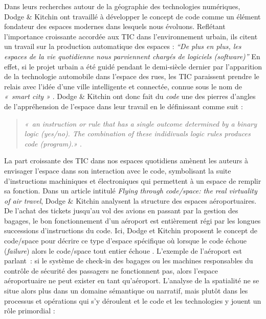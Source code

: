 Dans leurs recherches autour de la géographie des technologies numériques, Dodge \& Kitchin ont travaillé à développer le concept de code comme un élément fondateur des espaces modernes dans lesquels nous évoluons. Reflétant l’importance croissante accordée aux TIC dans l’environnement urbain, ils citent un travail sur la production automatique des espaces : \textit{“De plus en plus, les espaces de la vie  quotidienne nous parviennent chargés de logiciels (software)”} \citep{Thrift2002} En effet, si le projet urbain a été guidé pendant le demi-siècle dernier par l’apparition de la technologie automobile dans l’espace des rues, les TIC paraissent prendre le relais avec l’idée d’une ville intelligente et connectée, connue sous le nom de \textit{« smart city »} \citep{Ascher2009,Picon2014}. Dodge \& Kitchin ont donc fait du \textit{code} une des pierres d’angles de l’appréhension de l’espace dans leur travail en le définissant comme suit : 

\begin{quote}
\textit{« an instruction or rule that has a single outcome determined by a binary logic (yes/no). The combination of these indidivuals logic rules produces code (program).»} \citep{Kitchin2011}.
\end{quote}

La part croissante des TIC dans nos espaces quotidiens amènent les auteurs à envisager l’espace dans son interaction avec le code, symbolisant la suite d’instructions machiniques et électroniques qui permettent à un espace de remplir sa fonction. Dans un article intitulé \textit{Flying through code/space: the real virtuality of air travel}, Dodge \& Kitchin analysent la structure des espaces aéroportuaires. De l’achat des tickets jusqu’au vol des avions en passant par la gestion des bagages, le bon fonctionnement d’un aéroport est entièrement régi par les longues successions d’instructions du code. Ici, Dodge et Kitchin proposent le concept de code/space pour décrire ce type d’espace spécifique où lorsque le code échoue (\textit{failure}) alors le code/space tout entier échoue \citep{Dodge2004}. L’exemple de l’aéroport est parlant : si le système de check-in des bagages ou les machines responsables du contrôle de sécurité des passagers ne fonctionnent pas, alors l’espace aéroportuaire ne peut exister en tant qu’aéroport. L’analyse de la spatialité ne se situe alors plus dans un domaine sémantique ou narratif, mais plutôt dans les processus et opérations qui s’y déroulent et le code et les technologies y jouent un rôle primordial : 

